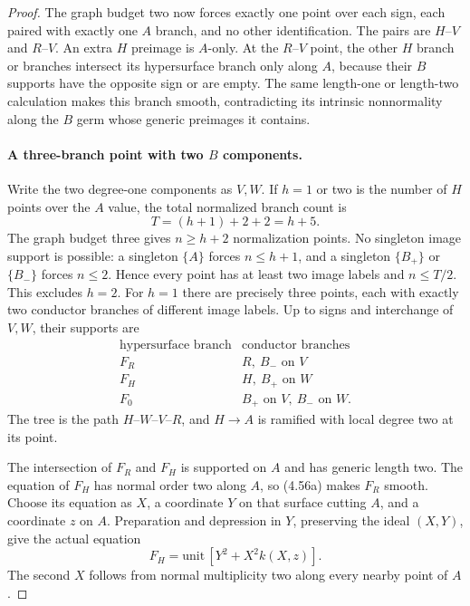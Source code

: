 \begin{proof}
The graph budget two now forces exactly one point over
each sign, each paired with exactly one $A$ branch, and
no other identification. The pairs are $H$--$V$ and
$R$--$V$. An extra $H$ preimage is $A$-only. At the
$R$--$V$ point, the other $H$ branch or branches intersect
its hypersurface branch only along $A$, because their
$B$ supports have the opposite sign or are empty. The
same length-one or length-two calculation makes this
branch smooth, contradicting its intrinsic nonnormality
along the $B$ germ whose generic preimages it contains.

\paragraph{A three-branch point with two $B$ components.}
Write the two degree-one components as $V,W$. If $h=1$
or two is the number of $H$ points over the $A$ value,
the total normalized branch count is
\[
                         T=(h+1)+2+2=h+5.
\]
The graph budget three gives $n\ge h+2$ normalization
points. No singleton image support is possible: a
singleton $\{A\}$ forces $n\le h+1$, and a singleton
$\{B_+\}$ or $\{B_-\}$ forces $n\le2$. Hence every
point has at least two image labels and $n\le T/2$.
This excludes $h=2$. For $h=1$ there are precisely
three points, each with exactly two conductor branches
of different image labels. Up to signs and interchange
of $V,W$, their supports are
\[
 \begin{array}{c|c}
 \text{hypersurface branch}&\text{conductor branches}\\ \hline
 F_R&R,\ B_-\text{ on }V\\
 F_H&H,\ B_+\text{ on }W\\
 F_0&B_+\text{ on }V,\ B_-\text{ on }W.
 \end{array}
                                                            \tag{4.56b}
\]
The tree is the path $H$--$W$--$V$--$R$, and $H\to A$
is ramified with local degree two at its point.

The intersection of $F_R$ and $F_H$ is supported on $A$
and has generic length two. The equation of $F_H$ has
normal order two along $A$, so (4.56a) makes $F_R$
smooth. Choose its equation as $X$, a coordinate $Y$
on that surface cutting $A$, and a coordinate $z$ on
$A$. Preparation and depression in $Y$, preserving the
ideal $(X,Y)$, give the actual equation
\[
                       F_H=\text{unit}\,[Y^2+X^2k(X,z)].
                                                            \tag{4.56c}
\]
The second $X$ follows from normal multiplicity two
along every nearby point of $A$.


\end{proof}
